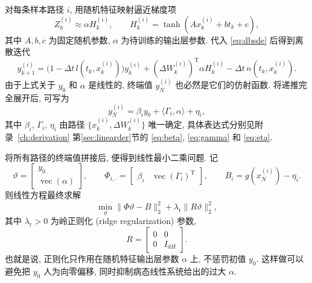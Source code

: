     对每条样本路径 $i$, 用随机特征映射逼近梯度项
    \begin{equation}
      Z_{k}^{(i)} \approx \alpha H_{k}^{(i)},
      \qquad
      H_{k}^{(i)} = \tanh(A x_{k}^{(i)} + b t_{k} + c),
      \label{eq:rff@l}
    \end{equation}
    其中 $A, b, c$ 为固定随机参数, $\alpha$ 为待训练的输出层参数.
    代入 \eqref{eq:dbsde} 后得到离散迭代
    \begin{equation}
      y_{k + 1}^{(i)}
      = \big( 1 - \Delta t\, l(t_{k}, x_{k}^{(i)}) \big) y_{k}^{(i)}
      + (\Delta W_{k}^{(i)})^{\operatorname{T}} \alpha H_{k}^{(i)}
      - \Delta t\, n(t_{k}, x_{k}^{(i)}).
      \label{eq:ldbsde}
    \end{equation}
    由于上式关于 $y_{0}$ 和 $\alpha$ 是线性的, 终端值 $y_{N}^{(i)}$ 也必然是它们的仿射函数.
    将递推完全展开后, 可写为
    \begin{equation}
      y_{N}^{(i)} = \beta_{i} y_{0} + \langle \Gamma_{i}, \alpha \rangle + \eta_{i},
      \label{eq:yN4i}
    \end{equation}
    其中 $\beta_{i}$, $\Gamma_{i}$, $\eta_{i}$ 由路径 $\{x_{k}^{(i)}, \Delta W_{k}^{(i)}\}$ 唯一确定,
    具体表达式分别见附录~\ref{ch:derivation} 第\ref{sec:linearder}节的
    \eqref{eq:beta}, \eqref{eq:gamma} 和 \eqref{eq:eta}.

    将所有路径的终端值拼接后, 便得到线性最小二乘问题.
    记
    \begin{equation}
      \vartheta =
      \begin{bmatrix}
        y_0 \\
        \operatorname{vec}(\alpha)
      \end{bmatrix},
      \qquad
      \Phi_{i,\cdot} =
      \begin{bmatrix}
        \beta_i & \operatorname{vec}(\Gamma_i)^{\operatorname{T}}
      \end{bmatrix},
      \qquad
      B_i = g(x_N^{(i)})-\eta_i.
      \label{eq:linear_design}
    \end{equation}
    则线性方程最终求解
    \begin{equation}
      \min_{\vartheta}
      \lVert \Phi \vartheta - B\rVert_2^2+\lambda_{\mathrm{r}}\lVert R\vartheta\rVert_2^2,
      \label{eq:llstsq}
    \end{equation}
    其中 $\lambda_{\mathrm{r}}>0$ 为岭正则化 (ridge regularization) 参数,
    \begin{equation}
      R =
      \begin{bmatrix}
        0 & 0 \\
        0 & I_{dH}
      \end{bmatrix}.
      \label{eq:linpen}
    \end{equation}
    也就是说, 正则化只作用在随机特征输出层参数 $\alpha$ 上, 不惩罚初值 $y_{0}$.
    这样做可以避免把 $y_{0}$ 人为向零偏移, 同时抑制病态线性系统给出的过大 $\alpha$.

